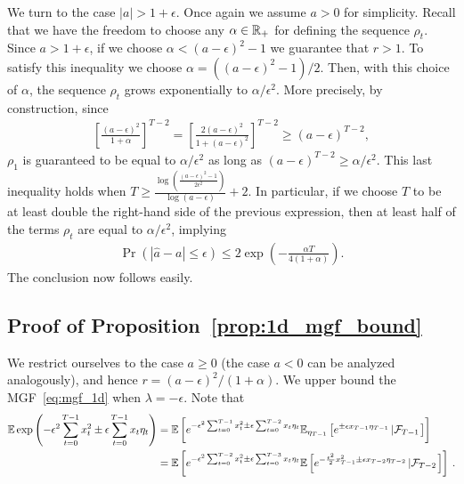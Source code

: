 We turn to the case $|a| > 1 + \epsilon$. Once again we assume $a > 0$ for simplicity. Recall that we have the freedom to choose any $\alpha \in \mathbb{R}_{+}$ for defining the sequence $\rho_t$.
Since $a > 1 + \epsilon$, if we choose $\alpha < (a - \epsilon)^2 - 1$ we guarantee that $r > 1$. To satisfy this inequality we choose $\alpha = ((a - \epsilon)^2 - 1)/2$.
Then, with this choice of $\alpha$, the sequence $\rho_t$ grows exponentially to $\alpha/\epsilon^2$. More precisely, by construction, since
\begin{align*}
\left[\frac{(a - \epsilon)^2}{1 + \alpha}\right]^{T - 2} = \left[\frac{2(a - \epsilon)^2}{1 + (a - \epsilon)^2}\right]^{T - 2} \geq (a - \epsilon)^{T - 2},
\end{align*}
$\rho_{1}$ is guaranteed to be equal to $\alpha/\epsilon^2$ as long as $(a - \epsilon)^{T - 2} \geq \alpha/\epsilon^2$. This last inequality holds when $T \geq \frac{\log\left(\frac{(a - \epsilon)^2 - 1}{2\epsilon^2}\right)}{\log(a - \epsilon)} + 2.$ In particular, if we choose $T$ to be at least double the right-hand side of the previous expression, then at least half of the terms $\rho_t$ are equal to $\alpha/\epsilon^2$, implying
\begin{align*}
\Pr(|\widehat a -  a| \leq \epsilon) \leq 2\exp\left(-\frac{\alpha T}{4(1 + \alpha)}\right).
\end{align*}
The conclusion now follows easily.


\subsection{Proof of Proposition~\ref{prop:1d_mgf_bound}}
\label{proof:1d_mgf}
We restrict ourselves to the case $a \geq 0$ (the case $a < 0$ can be analyzed analogously), and hence $r = (a - \epsilon)^2/(1 + \alpha)$. We  upper bound the MGF~\eqref{eq:mgf_1d} when $\lambda = -\epsilon$. Note that
\begin{align*}
\mathbb{E} \exp\left(- \epsilon^2 \sum_{t = 0}^{T - 1} x_t^2 \pm \epsilon \sum_{t = 0}^{T - 1} x_t \eta_t\right) &= \mathbb{E} \left[e^{ - \epsilon^2 \sum_{t = 0}^{T - 1} x_t^2 \pm \epsilon \sum_{t = 0}^{T - 2} x_t \eta_t}\mathbb{E}_{\eta_{T - 1}} \left[e^{\pm\epsilon x_{T - 1} \eta_{T - 1}}\left|\mathcal{F}_{T - 1}\right.\right]\right]\\
&= \mathbb{E} \left[e^{ - \epsilon^2 \sum_{t = 0}^{T - 2} x_t^2 \pm \epsilon \sum_{t = 0}^{T - 3} x_t \eta_t}\mathbb{E}\left[ e^{-\frac{\epsilon^2}{2} x_{T - 1}^2 \pm \epsilon x_{T - 2} \eta_{T - 2}}\left| \mathcal{F}_{T - 2}\right.\right]\right] \:.
\end{align*}

